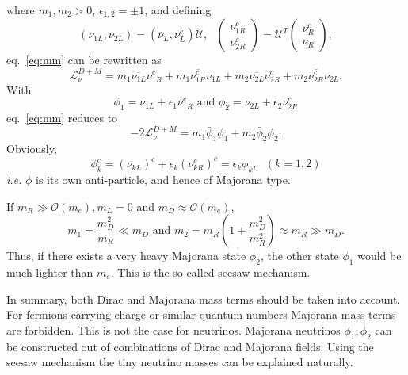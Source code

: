 where $m_{1}, m_{2} > 0$, $\epsilon_{1,2} = \pm 1$, and defining
\begin{equation}
\label{eq:mvet}
(\nu_{1L}, \nu_{2L}) = \left( \overline{\nu}_{L}, 
\overline{\nu^{c}_{L}} \right) \mathcal{U},\mbox{      }
\left(\begin{array}{c} \nu^{c}_{1R} \\            
\nu^{c}_{2R}\end{array}\right) = \mathcal{U}^{T}
\left(\begin{array}{c} \nu^{c}_{R} \\ \nu_{R} \end{array}\right),
\end{equation}
eq.~\ref{eq:mm} can be rewritten as
\begin{equation}
  \label{eq:m12}
  \mathcal{L}_{\nu}^{D+M} = m_{1}\overline{\nu_{1L}}\nu^{c}_{1R} +  
  m_{1}\overline{\nu^{c}_{1R}}\nu_{1L} +
  m_{2}\overline{\nu_{2L}}\nu^{c}_{2R} +  
  m_{2}\overline{\nu^{c}_{2R}}\nu_{2L}.
\end{equation}
With
\begin{equation}
  \label{eq:mafi}
  \phi_{1} = \nu_{1L} + \epsilon_{1}\nu^{c}_{1R}
  \mbox{\ \ \ and \ \ \ }
  \phi_{2} = \nu_{2L} + \epsilon_{2}\nu^{c}_{2R}
\end{equation}
eq.~\ref{eq:mm} reduces to
\begin{equation}
  \label{eq:mv}
  -2\mathcal{L}_{\nu}^{D+M} = m_{1}\bar{\phi}_{1}\phi_{1} +
  m_{2}\bar{\phi}_{2}\phi_{2}.
\end{equation}
Obviously,
\begin{equation}
  \label{eq:mach}
  \phi^{c}_{k} = (\nu_{kL})^{c} + \epsilon_{k}(\nu^{c}_{kR})^{c} =
  \epsilon_{k}\phi_{k}, ~~~ (k=1,2)
\end{equation}
\textit{i.e.} $\phi$ is its own anti-particle, and hence of Majorana
type.

If $m_{R} \gg \mathcal{O}(m_{e}), m_{L}=0$ and $m_{D} \approx
\mathcal{O}(m_{e})$,
\begin{equation}
  \label{eq:seesaw}
  m_{1} = \frac{m^{2}_{D}}{m_{R}}\ll m_{D}  \mbox{\ \ \ and \ \ \ }  
  m_{2} = m_{R}(1+\frac{m^{2}_{D}}{m^{2}_{R}}) \approx m_{R} \gg m_{D}.
\end{equation}
Thus, if there exists a very heavy Majorana state $\phi_2$, the other
state $\phi_1$ would be much lighter than $m_e$. This is the so-called
seesaw mechanism.

In summary, both Dirac and Majorana mass terms should be taken into
account. For fermions carrying charge or similar quantum numbers
Majorana mass terms are forbidden. This is not the case for
neutrinos. Majorana neutrinos $\phi_{1}, \phi_{2}$ can be constructed
out of combinations of Dirac and Majorana fields. Using the seesaw
mechanism the tiny neutrino masses can be explained naturally.


